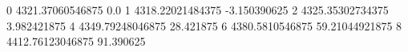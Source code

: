 0 4321.37060546875 0.0
1 4318.22021484375 -3.150390625
2 4325.35302734375 3.982421875
4 4349.79248046875 28.421875
6 4380.5810546875 59.21044921875
8 4412.76123046875 91.390625
